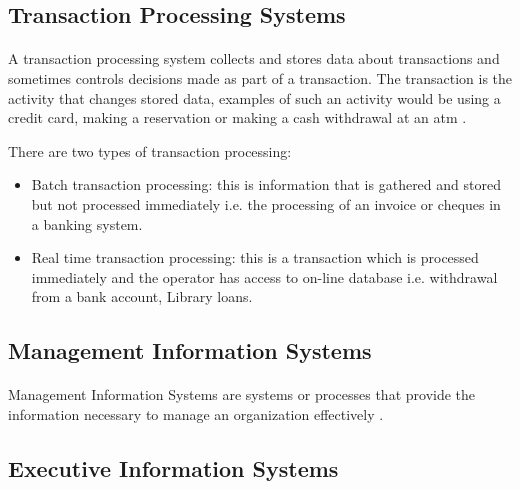 
\subsection{Transaction Processing Systems}

\paragraph{} A transaction processing system collects and stores data about transactions and sometimes controls decisions made as part of a transaction. The transaction is the activity that changes stored data, examples of such an activity would be using a credit card, making a reservation or making a cash withdrawal at an \acrshort{atm} \cite{NSWHSC2013}.

There are two types of transaction processing:

\begin{itemize}
\item Batch transaction processing: this is information that is gathered and stored but not processed immediately i.e. the processing of an invoice or cheques in a banking system.
\item Real time transaction processing: this is a transaction which is processed immediately and the operator has access to on-line database i.e. withdrawal from a bank account, Library loans.
\end{itemize}

\subsection{Management Information Systems}

\paragraph{} Management Information Systems are systems or processes that provide the information necessary to manage an organization effectively \cite{Comptroller1995, TexasAMUni2012}. 

\subsection{Executive Information Systems}

\paragraph{} 

